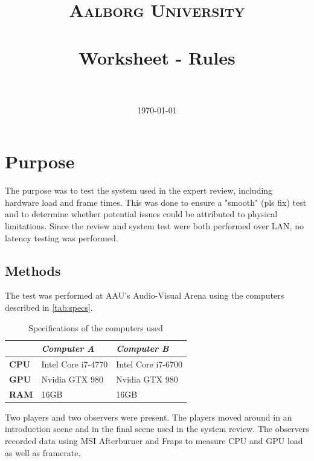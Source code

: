 \documentclass[paper=a4, fontsize=11pt]{scrartcl} %
\title{	
\normalfont \normalsize 
\textsc{Aalborg University} \\ [25pt] %
\horrule{0.5pt} \\[0.4cm] %
\huge Worksheet - Rules \\ %
\horrule{2pt} \\[0.5cm] %
}
\date{\normalsize\today} %
\numberwithin{equation}{section} %
\numberwithin{figure}{section} %
\numberwithin{table}{section} %
\begin{document}
\maketitle %


\section{Purpose}

The purpose was to test the system used in the expert review, including hardware load and frame times. This was done to ensure a "smooth" (pls fix) test and to determine whether potential issues could be attributed to physical limitations. Since the review and system test were both performed over LAN, no latency testing was performed.

\subsection{Methods}

The test was performed at AAU's Audio-Visual Arena using the computers described in \autoref{tab:specs}. 

\begin{table}
\centering
\begin{tabularx}{0.48\textwidth}{X X X}
\toprule
                     & \textit{Computer A} & \textit{Computer B} \\ \midrule \rowcolor{lightGrey}
\textbf{CPU}         & Intel Core i7-4770  & Intel Core i7-6700  \\

\textbf{GPU}         & Nvidia GTX 980      & Nvidia GTX 980    \\  \rowcolor{lightGrey}

\textbf{RAM} 		 & 16GB                & 16GB                 \\ \toprule
\end{tabularx}
\caption{Specifications of the computers used}
\label{tab:specs}
\end{table}

Two players and two observers were present. The players moved around in an introduction scene and in the final scene used in the system review. The observers recorded data using MSI Afterburner and Fraps to measure CPU and GPU load as well as framerate.
\end{document}
